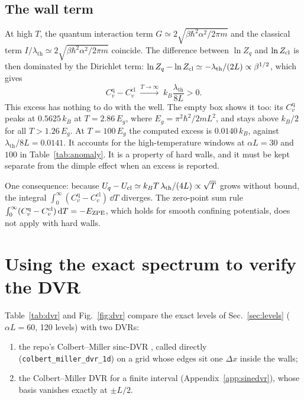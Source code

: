 \documentclass[11pt]{article}
\numberwithin{equation}{section}
\newcommand{\lth}{\lambda_{\mathrm{th}}}
\newcommand{\Cq}{C_v^{\mathrm{q}}}
\newcommand{\Ccl}{C_v^{\mathrm{cl}}}
\newcommand{\kB}{k_{B}}
\begin{document}
\subsection{The wall term}
\label{sec:walls}
At high $T$, the quantum interaction term $G\simeq2\sqrt{\beta\hbar^2\alpha^2/2\pi m}$ and the classical term $I/\lth\simeq2\sqrt{\beta\hbar^2\alpha^2/2\pi m}$ coincide. The difference between $\ln Z_q$ and $\ln Z_{\rm cl}$ is then dominated by the Dirichlet term: $\ln Z_q-\ln Z_{\rm cl}\simeq-\lth/(2L)\propto\beta^{1/2}$, which gives
\begin{equation}
\Cq-\Ccl\;\xrightarrow{T\to\infty}\;\kB\frac{\lth}{8L}>0 .
\end{equation}
This excess has nothing to do with the well. The empty box shows it too: its $\Cq$ peaks at $0.5625\,\kB$ at $T=2.86\,E_g$, where $E_g=\pi^2\hbar^2/2mL^2$, and stays above $\kB/2$ for all $T>1.26\,E_g$. At $T=100\,E_g$ the computed excess is $0.0140\,\kB$, against $\lth/8L=0.0141$. It accounts for the high-temperature windows at $\alpha L=30$ and $100$ in Table~\ref{tab:anomaly}. It is a property of hard walls, and it must be kept separate from the dimple effect when an excess is reported.

One consequence: because $U_q-U_{\rm cl}\simeq\kB T\,\lth/(4L)\propto\sqrt T$ grows without bound, the integral $\int_0^\infty(\Cq-\Ccl)\,\dd T$ diverges. The zero-point sum rule $\int_0^\infty(\Cq-\Ccl)\,\dd T=-E_{\rm ZPE}$, which holds for smooth confining potentials, does not apply with hard walls.

\section{Using the exact spectrum to verify the DVR}
\label{sec:dvr}
Table~\ref{tab:dvr} and Fig.~\ref{fig:dvr} compare the exact levels of Sec.~\ref{sec:levels} ($\alpha L=60$, 120 levels) with two DVRs:
\begin{enumerate}[itemsep=1pt]
\item the repo's Colbert--Miller sinc-DVR \cite{colbertmiller1992}, called directly (\texttt{colbert\_miller\_dvr\_1d}) on a grid whose edges sit one $\Delta x$ inside the walls;
\item the Colbert--Miller DVR for a finite interval (Appendix~\ref{app:sinedvr}), whose basis vanishes exactly at $\pm L/2$.
\end{enumerate}
\end{document}
